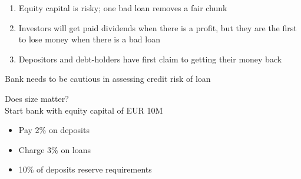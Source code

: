 \documentclass{beamer}
\begin{document}
\begin{frame}
\begin{table}[!h] \centering
\caption{Balance sheet after expanding the business}
\end{table}

\end{frame}

\begin{frame} 
\begin{enumerate}
  \item Equity capital is risky; one bad loan removes a fair chunk
  \item Investors will get paid dividends when there is a profit, but they are the first to lose money when there is a bad loan
  \item Depositors and debt-holders have first claim to getting their money back
\end{enumerate}
 \medskip
  Bank needs to be cautious in assessing credit risk of loan
\end{frame}

\begin{frame}
 Does size matter?\\
 \medskip
 Start bank with equity capital of EUR 10M 
 \begin{itemize}
  \item Pay 2\% on deposits
  \item Charge 3\% on loans
  \item 10\% of deposits reserve requirements 
\end{itemize}
\end{frame}
\end{document}
